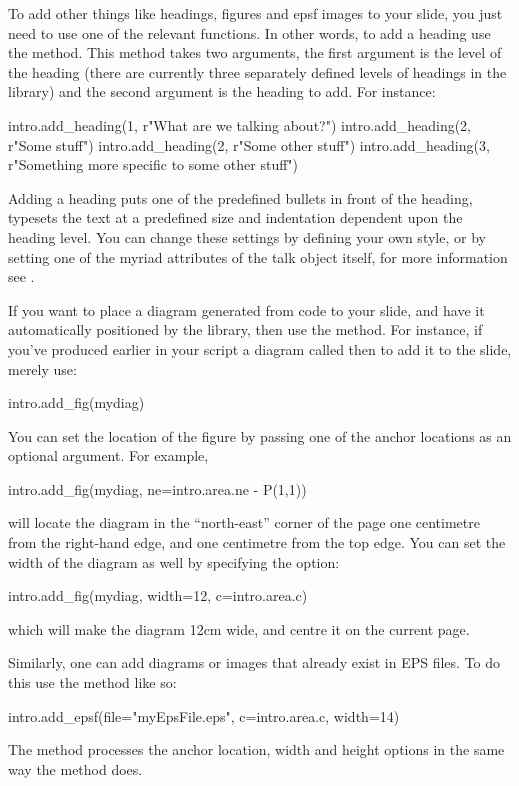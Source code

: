 To add other things like headings, figures and epsf images to your slide,
you just need to use one of the relevant  functions.  In other
words, to add a heading use the  method.  This method
takes two arguments, the first argument is the level of the heading (there
are currently three separately defined levels of headings in the library)
and the second argument is the heading to add.  For instance:
\begin{python}
intro.add_heading(1, r"What are we talking about?")
intro.add_heading(2, r"Some stuff")
intro.add_heading(2, r"Some other stuff")
intro.add_heading(3, r"Something more specific to some other stuff")
\end{python}
Adding a heading puts one of the predefined bullets in front of the heading,
typesets the text at a predefined size and indentation dependent upon the
heading level.  You can change these settings by defining your own style, or
by setting one of the myriad attributes of the talk object itself, for more
information see .

If you want to place a diagram generated from \pyscript code to your slide,
and have it automatically positioned by the library, then use the
 method.  For instance, if you've produced earlier in your
\pyscript script a diagram called  then to add it to the slide,
merely use:
\begin{python}
intro.add_fig(mydiag)
\end{python}
You can set the location of the figure by passing one of the \pyscript anchor
locations as an optional argument.  For example,
\begin{python}
intro.add_fig(mydiag, ne=intro.area.ne - P(1,1))
\end{python}
will locate the diagram in the ``north-east'' corner of the page one
centimetre from the right-hand edge, and one centimetre from the top edge.
You can set the width of the diagram as well by specifying the 
option:
\begin{python}
intro.add_fig(mydiag, width=12, c=intro.area.c)
\end{python}
which will make the diagram 12cm wide, and centre it on the current page.

Similarly, one can add diagrams or images that already exist in EPS files.
To do this use the  method like so:
\begin{python}
intro.add_epsf(file="myEpsFile.eps", c=intro.area.c, width=14)
\end{python}
The  method processes the anchor location, width and height
options in the same way the  method does.

